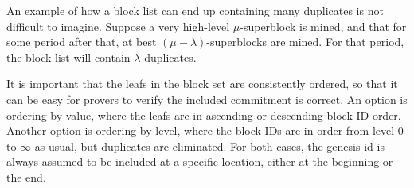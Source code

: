 An example of how a block list can end up containing many duplicates is not difficult to imagine. Suppose a very high-level $\mu$-superblock is mined, and that for some period after that, at best $(\mu-\lambda)$-superblocks are mined. For that period, the block list will contain $\lambda$ duplicates.

It is important that the leafs in the block set are consistently ordered, so that it can be easy for provers to verify the included commitment is correct. An option is ordering by value, where the leafs are in ascending or descending block ID order. Another option is ordering by level, where the block IDs are in order from level $0$ to $\infty$ as usual, but duplicates are eliminated. For both cases, the genesis id is always assumed to be included at a specific location, either at the beginning or the end.

